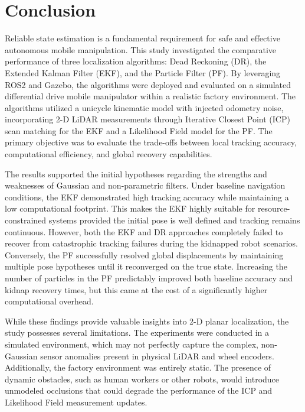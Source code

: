 \section{Conclusion}\label{Conclusion}
Reliable state estimation is a fundamental requirement for safe and effective autonomous mobile manipulation. 
This study investigated the comparative performance of three localization algorithms: Dead Reckoning (DR), the Extended Kalman Filter (EKF), and the Particle Filter (PF). 
By leveraging ROS2 and Gazebo, the algorithms were deployed and evaluated on a simulated differential drive mobile manipulator within a realistic factory environment. 
The algorithms utilized a unicycle kinematic model with injected odometry noise, incorporating 2-D LiDAR measurements through Iterative Closest Point (ICP) scan matching for the EKF and a Likelihood Field model for the PF. 
The primary objective was to evaluate the trade-offs between local tracking accuracy, computational efficiency, and global recovery capabilities.

The results supported the initial hypotheses regarding the strengths and weaknesses of Gaussian and non-parametric filters. 
Under baseline navigation conditions, the EKF demonstrated high tracking accuracy while maintaining a low computational footprint. 
This makes the EKF highly suitable for resource-constrained systems provided the initial pose is well defined and tracking remains continuous. 
However, both the EKF and DR approaches completely failed to recover from catastrophic tracking failures during the kidnapped robot scenarios. 
Conversely, the PF successfully resolved global displacements by maintaining multiple pose hypotheses until it reconverged on the true state. 
Increasing the number of particles in the PF predictably improved both baseline accuracy and kidnap recovery times, but this came at the cost of a significantly higher computational overhead.

While these findings provide valuable insights into 2-D planar localization, the study possesses several limitations. 
The experiments were conducted in a simulated environment, which may not perfectly capture the complex, non-Gaussian sensor anomalies present in physical LiDAR and wheel encoders. 
Additionally, the factory environment was entirely static. 
The presence of dynamic obstacles, such as human workers or other robots, would introduce unmodeled occlusions that could degrade the performance of the ICP and Likelihood Field measurement updates. 

